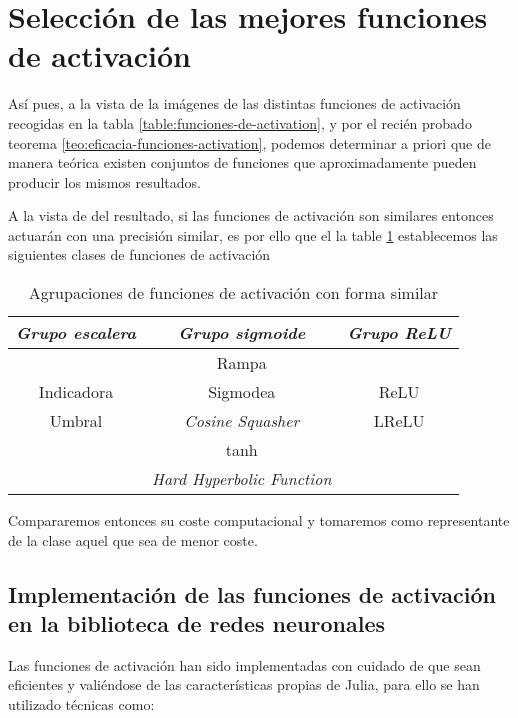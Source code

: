 \section{ Selección de las mejores funciones de activación}
Así pues, a la vista de la imágenes de las distintas funciones de activación 
recogidas en la tabla \ref{table:funciones-de-activation}, y
por el recién probado teorema \ref{teo:eficacia-funciones-activation}, podemos determinar a priori 
que de manera teórica existen conjuntos de funciones que aproximadamente  pueden producir los mismos resultados. 

A la vista de del resultado, si las funciones de 
activación son similares entonces actuarán con 
una precisión similar, es por ello 
que el la table \ref{table:Clases-equivalencia-activation-function} establecemos 
las siguientes clases de funciones de activación 

\begin{table}[H] 
    \centering  
    \begin{tabular}{| c | c | c | }
        \hline
        \textit{Grupo escalera} & \textit{Grupo sigmoide} & \textit{Grupo ReLU} \\
        \hline
       &  Rampa &  \\
       Indicadora & Sigmodea & ReLU\\
       Umbral & \textit{Cosine Squasher}& LReLU\\
        & tanh & \\
        & \textit{Hard Hyperbolic Function}& \\
\hline
    \end{tabular}
    \caption{Agrupaciones de funciones de activación con forma similar}  
    \label{table:Clases-equivalencia-activation-function}
\end{table}

Compararemos entonces su coste computacional y tomaremos como representante de la clase aquel que sea de menor coste. 


\subsection{ Implementación de las funciones de activación en la biblioteca de redes neuronales} 
\label{ch06:activation-function-implementation}
Las funciones de activación han sido implementadas con cuidado de que sean eficientes 
y valiéndose de las características propias de Julia, para ello se han utilizado técnicas como: 

